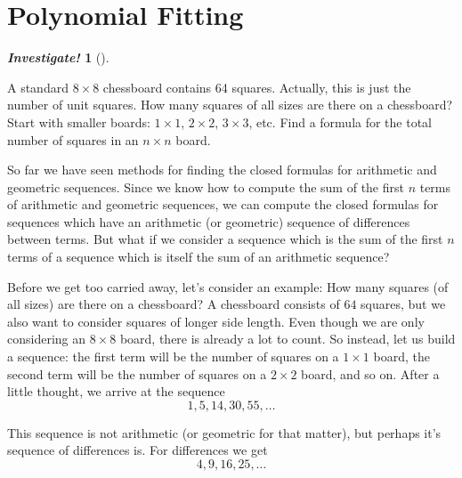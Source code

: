 \documentclass[10pt,]{book}
\theoremstyle{plain}
\theoremstyle{definition}
\theoremstyle{definition}
\newtheorem{investigation}[project]{\emph{Investigate!}}
\theoremstyle{definition}
\numberwithin{equation}{chapter}
\begin{document}
\section[Polynomial Fitting]{Polynomial Fitting}\label{sec_polyfit}

%
\begin{investigation}[]\label{investigation-20}

A standard \(8 \times 8\) chessboard contains 64 squares. Actually, this is just the number of unit squares. How many squares of all sizes are there on a chessboard? Start with smaller boards: \(1\times 1\), \(2 \times 2\), \(3\times 3\), etc. Find a formula for the total number of squares in an \(n\times n\) board.
%
\end{investigation}
\par

So far we have seen methods for finding the closed formulas for arithmetic and geometric sequences. Since we know how to compute the sum of the first \(n\) terms of arithmetic and geometric sequences, we can compute the closed formulas for sequences which have an arithmetic (or geometric) sequence of differences between terms. But what if we consider a sequence which is the sum of the first \(n\) terms of a sequence which is itself the sum of an arithmetic sequence?
%
\par

Before we get too carried away, let's consider an example: How many squares (of all sizes) are there on a chessboard? A chessboard consists of \(64\) squares, but we also want to consider squares of longer side length. Even though we are only considering an \(8 \times 8\) board, there is already a lot to count. So instead, let us build a sequence: the first term will be the number of squares on a \(1 \times 1\) board, the second term will be the number of squares on a \(2 \times 2\) board, and so on. After a little thought, we arrive at the sequence
\begin{equation*}
  1,5,14,30, 55,\ldots
\end{equation*}
%
\par

This sequence is not arithmetic (or geometric for that matter), but perhaps it's sequence of differences is. For differences we get
\begin{equation*}
  4, 9, 16, 25, \ldots
\end{equation*}
%
\par
\end{document}
